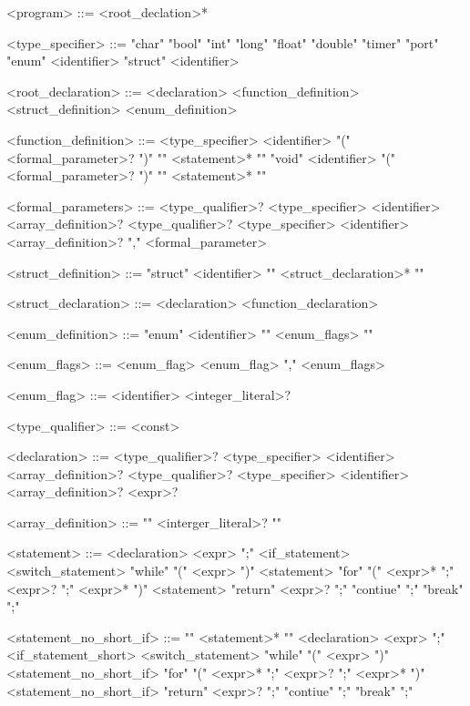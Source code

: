 \begin{grammar}
 
 
 
 
 <program> ::= <root\_declation>*
 
 <type\_specifier> ::= "char"
 \alt "bool"
 \alt "int"
 \alt "long"
 \alt "float"
 \alt "double"
 \alt "timer"
 \alt "port"
 \alt "enum" <identifier>
 \alt "struct" <identifier>
 
 <root\_declaration> ::= <declaration>
 \alt <function\_definition>
 \alt <struct\_definition>
 \alt <enum\_definition>
 
 <function\_definition> ::= <type\_specifier> <identifier> "(" <formal\_parameter>? ")" "{" <statement>* "}"
 \alt "void" <identifier> "(" <formal\_parameter>? ")" "{" <statement>* "}"
 
 <formal\_parameters> ::= <type\_qualifier>? <type\_specifier> <identifier> <array\_definition>?
 \alt <type\_qualifier>? <type\_specifier> <identifier> <array\_definition>? "," <formal\_parameter>
 
 <struct\_definition> ::= "struct" <identifier> "{" <struct\_declaration>* "}"
 
 <struct\_declaration> ::= <declaration>
 \alt <function\_declaration>
 
 <enum\_definition> ::= "enum" <identifier> "{" <enum\_flags> "}"
 
 <enum\_flags> ::= <enum\_flag>
 \alt <enum\_flag> "," <enum\_flags>
 
 <enum\_flag> ::= <identifier> <integer\_literal>?
 
 <type\_qualifier> ::= <const>
 
 <declaration> ::= <type\_qualifier>? <type\_specifier> <identifier> <array\_definition>?
 \alt <type\_qualifier>? <type\_specifier> <identifier> <array\_definition>? <expr>?
 
 <array\_definition> ::= "{" <interger\_literal>? "}"
 
 <statement> ::= <declaration>
 \alt <expr> ";"
 \alt <if\_statement>
 \alt <switch\_statement>
 \alt "while" "(" <expr> ")" <statement>
 \alt "for" "(" <expr>* ";" <expr>? ";" <expr>* ")" <statement>
 \alt "return" <expr>? ";"
 \alt "contiue" ";"
 \alt "break" ";"
 
 <statement\_no\_short\_if> ::= "{" <statement>* "}"
 \alt <declaration>
 \alt <expr> ";"
 \alt <if\_statement\_short>
 \alt <switch\_statement>
 \alt "while" "(" <expr> ")" <statement\_no\_short\_if>
 \alt "for" "(" <expr>* ";" <expr>? ";" <expr>* ")" <statement\_no\_short\_if>
 \alt "return" <expr>? ";"
 \alt "contiue" ";"
 \alt "break" ";"
 

\end{grammar}
